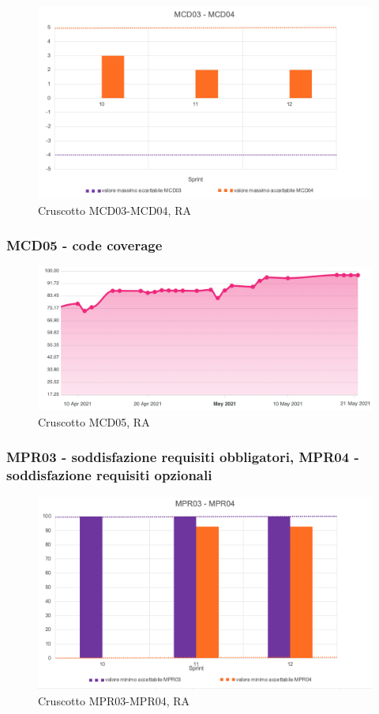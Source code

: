 \begin{figure}[H] 
    \centering
    \includegraphics[scale = 0.8]{immagini/ImmRA/MCD0304.png}
    \caption{Cruscotto MCD03-MCD04, RA}
\end{figure}


\subsubsection*{MCD05 - code coverage }

\begin{figure}[H] 
    \centering
    \includegraphics[scale = 1]{immagini/ImmRA/MCD05.png}
    \caption{Cruscotto MCD05, RA}
\end{figure}


\subsubsection*{MPR03 - soddisfazione requisiti obbligatori, MPR04 - soddisfazione requisiti opzionali }

\begin{figure}[H] 
    \centering
    \includegraphics[scale = 0.8]{immagini/ImmRA/MPR0304.png}
    \caption{Cruscotto MPR03-MPR04, RA}
\end{figure}

